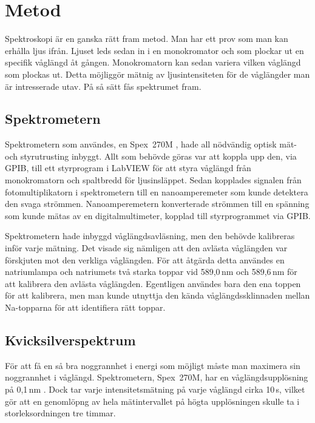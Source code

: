 \documentclass[11pt,a4paper]{article}
\begin{document}
\section{Metod}
Spektroskopi är en ganska rätt fram metod. Man har ett prov som man
kan erhålla ljus ifrån. Ljuset leds sedan in i en monokromator och som
plockar ut en specifik våglängd åt gången. Monokromatorn kan sedan
variera vilken våglängd som plockas ut. Detta möjliggör mätnig av
ljusintensiteten för de våglängder man är intresserade utav. På så
sätt fås spektrumet fram.

\subsection{Spektrometern}

Spektrometern som användes, en Spex~270M \cite{Spex270M}, hade all
nödvändig optisk mät- och styrutrusting inbyggt. Allt som behövde
göras var att koppla upp den, via GPIB, till ett styrprogram i LabVIEW
för att styra våglängd från monokromatorn och spaltbredd för
ljusinsläppet. Sedan kopplades signalen från fotomultiplikatorn i
spektrometern till en nanoamperemeter som kunde detektera den svaga
strömmen. Nanoamperemetern konverterade strömmen till en spänning som
kunde mätas av en digitalmultimeter, kopplad till styrprogrammet via
GPIB. 

Spektrometern hade inbyggd våglängdsavläsning, men den behövde
kalibreras inför varje mätning. Det visade sig nämligen att den
avlästa våglängden var förskjuten mot den verkliga våglängden. För att
åtgärda detta användes en natriumlampa och natriumets två starka
toppar vid 589,0\,nm och 589,6\,nm för att kalibrera den avlästa
våglängden. Egentligen användes bara den ena toppen för att kalibrera,
men man kunde utnyttja den kända våglängdssklinnaden mellan
Na-topparna för att identifiera rätt toppar. 


\subsection{Kvicksilverspektrum}
För att få en så bra noggrannhet i energi som möjligt måste man
maximera sin noggrannhet i våglängd. Spektrometern, Spex~270M, har en
våglängdsupplösning på 0,1\,nm \cite{Spex270M}. Dock tar varje
intensitetsmätning på varje våglängd cirka 10\,s, vilket gör att en
genomlöpng av hela mätintervallet på högta upplösningen skulle ta i
storleksordningen tre timmar. 
\end{document}
